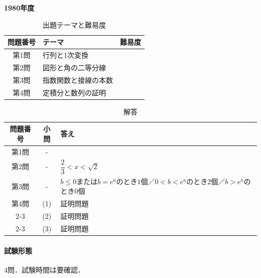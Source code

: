 \documentclass[../../main.tex]{subfiles}
\begin{document}
\begin{center}
  {\fontsize{48pt}{58pt}\selectfont \textbf{1980}\normalsize\textbf{年度}}
\end{center}

\begin{table}[htb]
  \centering
  \caption{出題テーマと難易度}
  \begin{tabular}{|c|p{9cm}|c|}
    \hline
    \textbf{問題番号} & \textbf{テーマ} & \textbf{難易度} \\
    \hline
    第1問 & 行列と1次変換 & \\
    \hline
    第2問 & 図形と角の二等分線 & \\
    \hline
    第3問 & 指数関数と接線の本数 & \\
    \hline
    第4問 & 定積分と数列の証明 & \\
    \hline
  \end{tabular}
\end{table}

\begin{table}[htb]
  \centering
  \caption{解答}
  \renewcommand{\arraystretch}{1.4}
  \begin{tabular}{|c|c|p{9cm}|}
    \hline
    \textbf{問題番号} & \textbf{小問} & \textbf{答え} \\
    \hline
    第1問 & - &  \\
    \hline
    第2問 & - & $\dfrac{2}{3}<x<\sqrt{2}$ \\
    \hline
    第3問 & - & $b\le0$または$b=e^a$のとき$1$個／$0<b<e^a$のとき$2$個／$b>e^a$のとき$0$個 \\
    \hline
    第4問 & (1) & 証明問題 \\
    \cline{2-3}
    & (2) & 証明問題 \\
    \cline{2-3}
    & (3) & 証明問題 \\
    \hline
  \end{tabular}
\end{table}

\paragraph{試験形態}
4問．試験時間は要確認．
\end{document}
